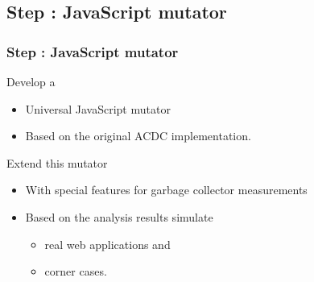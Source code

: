 \subsection{Step \theStepCounter: JavaScript mutator}
\begin{frame}
	\frametitle{Step \theStepCounter: JavaScript mutator}
	Develop a 
	\begin{itemize}
		\item Universal JavaScript mutator
		\item Based on the original ACDC implementation.
	\end{itemize}
		
	\pause
		
	Extend this mutator
	\begin{itemize}
		\item With special features for garbage collector measurements
		\item Based on the analysis results simulate
		\begin{itemize}
			\item real web applications and
			\item corner cases. 
		\end{itemize}
	\end{itemize}
\end{frame}
